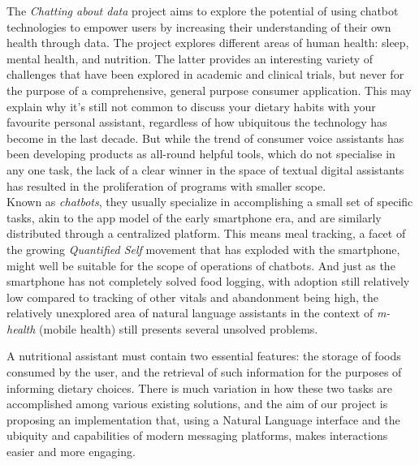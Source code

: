 The \textit{Chatting about data} project aims to explore the potential of using chatbot technologies to empower users by increasing their understanding of their own health through data. The project explores different areas of human health: sleep, mental health, and nutrition. The latter provides an interesting variety of challenges that have been explored in academic and clinical trials, but never for the purpose of a comprehensive, general purpose consumer application. This may explain why it’s still not common to discuss your dietary habits with your favourite personal assistant, regardless of how ubiquitous the technology has become in the last decade. But while the trend of consumer voice assistants has been developing products as all-round helpful tools, which do not specialise in any one task, the lack of a clear winner in the space of textual digital assistants has resulted in the proliferation of programs with smaller scope.\\
Known as \textit{chatbots}, they usually specialize in accomplishing a small set of specific tasks, akin to the app model of the early smartphone era, and are similarly distributed through a centralized platform. This means meal tracking, a facet of the growing \textit{Quantified Self} movement that has exploded with the smartphone, might well be suitable for the scope of operations of chatbots. And just as the smartphone has not completely solved food logging, with adoption still relatively low compared to tracking of other vitals and abandonment being high, the relatively unexplored area of natural language assistants in the context of \textit{m-health} (mobile health) still presents several unsolved problems.

A nutritional assistant must contain two essential features: the storage of foods consumed by the user, and the retrieval of such information for the purposes of informing dietary choices. There is much variation in how these two tasks are accomplished among various existing solutions, and the aim of our project is proposing an implementation that, using a Natural Language interface and the ubiquity and capabilities of modern messaging platforms, makes interactions easier and more engaging.

